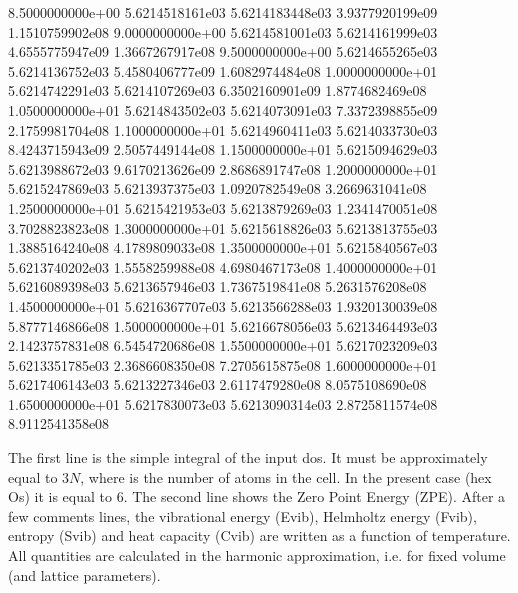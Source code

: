 \documentclass[letterpaper,10pt,english]{sphinxmanual}
\begin{document}
\begin{sphinxVerbatim}[commandchars=\\\{\}]
8.5000000000e+00	5.6214518161e\PYGZhy{}03	5.6214183448e\PYGZhy{}03	3.9377920199e\PYGZhy{}09	1.1510759902e\PYGZhy{}08
9.0000000000e+00	5.6214581001e\PYGZhy{}03	5.6214161999e\PYGZhy{}03	4.6555775947e\PYGZhy{}09	1.3667267917e\PYGZhy{}08
9.5000000000e+00	5.6214655265e\PYGZhy{}03	5.6214136752e\PYGZhy{}03	5.4580406777e\PYGZhy{}09	1.6082974484e\PYGZhy{}08
1.0000000000e+01	5.6214742291e\PYGZhy{}03	5.6214107269e\PYGZhy{}03	6.3502160901e\PYGZhy{}09	1.8774682469e\PYGZhy{}08
1.0500000000e+01	5.6214843502e\PYGZhy{}03	5.6214073091e\PYGZhy{}03	7.3372398855e\PYGZhy{}09	2.1759981704e\PYGZhy{}08
1.1000000000e+01	5.6214960411e\PYGZhy{}03	5.6214033730e\PYGZhy{}03	8.4243715943e\PYGZhy{}09	2.5057449144e\PYGZhy{}08
1.1500000000e+01	5.6215094629e\PYGZhy{}03	5.6213988672e\PYGZhy{}03	9.6170213626e\PYGZhy{}09	2.8686891747e\PYGZhy{}08
1.2000000000e+01	5.6215247869e\PYGZhy{}03	5.6213937375e\PYGZhy{}03	1.0920782549e\PYGZhy{}08	3.2669631041e\PYGZhy{}08
1.2500000000e+01	5.6215421953e\PYGZhy{}03	5.6213879269e\PYGZhy{}03	1.2341470051e\PYGZhy{}08	3.7028823823e\PYGZhy{}08
1.3000000000e+01	5.6215618826e\PYGZhy{}03	5.6213813755e\PYGZhy{}03	1.3885164240e\PYGZhy{}08	4.1789809033e\PYGZhy{}08
1.3500000000e+01	5.6215840567e\PYGZhy{}03	5.6213740202e\PYGZhy{}03	1.5558259988e\PYGZhy{}08	4.6980467173e\PYGZhy{}08
1.4000000000e+01	5.6216089398e\PYGZhy{}03	5.6213657946e\PYGZhy{}03	1.7367519841e\PYGZhy{}08	5.2631576208e\PYGZhy{}08
1.4500000000e+01	5.6216367707e\PYGZhy{}03	5.6213566288e\PYGZhy{}03	1.9320130039e\PYGZhy{}08	5.8777146866e\PYGZhy{}08
1.5000000000e+01	5.6216678056e\PYGZhy{}03	5.6213464493e\PYGZhy{}03	2.1423757831e\PYGZhy{}08	6.5454720686e\PYGZhy{}08
1.5500000000e+01	5.6217023209e\PYGZhy{}03	5.6213351785e\PYGZhy{}03	2.3686608350e\PYGZhy{}08	7.2705615875e\PYGZhy{}08
1.6000000000e+01	5.6217406143e\PYGZhy{}03	5.6213227346e\PYGZhy{}03	2.6117479280e\PYGZhy{}08	8.0575108690e\PYGZhy{}08
1.6500000000e+01	5.6217830073e\PYGZhy{}03	5.6213090314e\PYGZhy{}03	2.8725811574e\PYGZhy{}08	8.9112541358e\PYGZhy{}08
\end{sphinxVerbatim}

The first line is the simple integral of the input dos. It must be approximately equal to \(3N\), where  is the number of atoms in the cell. In the present case (hex Os) it is equal to 6. The second line shows the Zero Point Energy (ZPE). After a few comments lines, the vibrational energy (Evib), Helmholtz energy (Fvib), entropy (Svib) and heat capacity (Cvib) are written as a function of temperature. All quantities are calculated in the harmonic approximation, i.e. for fixed volume (and lattice parameters).
\end{document}
